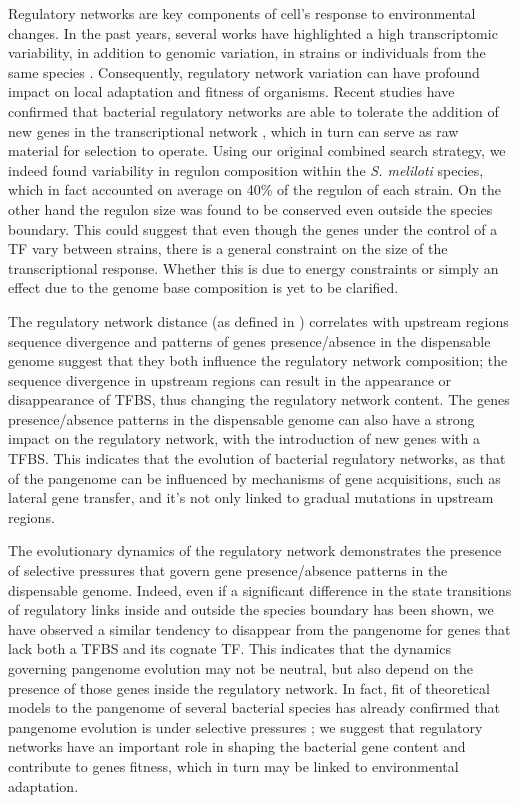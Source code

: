 Regulatory networks are key components of cell's response to environmental changes. In the past years, several works have highlighted a high transcriptomic variability, in addition to genomic variation, in strains or individuals from the same species \cite{Cavalieri24102000, kvitek2008variations}.
Consequently, regulatory network variation can have profound impact on local adaptation and fitness of organisms. Recent studies have confirmed that bacterial regulatory networks are able to tolerate the addition of new genes in the transcriptional network \cite{isalan2008evolvability}, which in turn can serve as raw material for selection to operate. Using our original combined search strategy, we indeed found variability in regulon composition within the \textit{S. meliloti} species, which in fact accounted on average on 40\% of the regulon of each strain. On the other hand the regulon size was found to be conserved even outside the species boundary. This could suggest that even though the genes under the control of a TF vary between strains, there is a general constraint on the size of the transcriptional response. Whether this is due to energy constraints or simply an effect due to the genome base composition is yet to be clarified. 

The regulatory network distance (as defined in \cite{babu2006evolutionary}) correlates with upstream regions sequence divergence and patterns of genes presence/absence in the dispensable genome suggest that they both influence the regulatory network composition; the sequence divergence in upstream regions can result in the appearance or disappearance of TFBS, thus changing the regulatory network content. The genes presence/absence patterns in the dispensable genome can also have a strong impact on the regulatory network, with the introduction of new genes with a TFBS. This indicates that the evolution of bacterial regulatory networks, as that of the pangenome can be influenced by mechanisms of gene acquisitions, such as lateral gene transfer, and it's not only linked to gradual mutations in upstream regions.

The evolutionary dynamics of the regulatory network demonstrates the presence of selective pressures that govern gene presence/absence patterns in the dispensable genome. Indeed, even if a significant difference in the state transitions of regulatory links inside and outside the species boundary has been shown,  we have observed a similar tendency to disappear from the pangenome for genes that lack both a TFBS and its cognate TF. This indicates that the dynamics governing pangenome evolution may not be neutral, but also depend on the presence of those genes inside the regulatory network. In fact, fit of theoretical models to the pangenome of several bacterial species has already confirmed that pangenome evolution is under selective pressures \cite{lobkovsky2013gene}; we suggest that regulatory networks have an important role in shaping the bacterial gene content and contribute to genes fitness, which in turn may be linked to environmental adaptation. 

